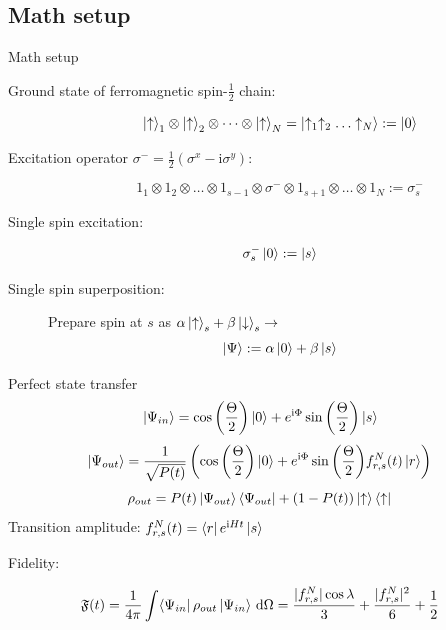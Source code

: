 \documentclass{beamer}
\begin{document}
\subsection{Math setup}
\begin{frame}{Math setup}
	\begin{description}
	\item [Ground state of ferromagnetic spin-$\frac{1}{2}$ chain:] \[ \ket{\uparrow}_1 \otimes \ket{\uparrow}_2 \otimes \dots \otimes \ket{\uparrow}_N = \ket{\uparrow_1\uparrow_2\dots\uparrow_N} := \ket{0} \]
	\item [Excitation operator $\sigma^- = \frac{1}{2}\left(\sigma^x - \text{i}\sigma^y\right)$:] \[ \text{1}_1 \otimes \text{1}_2 \otimes \dots \otimes \text{1}_{s-1} \otimes \sigma^- \otimes \text{1}_{s+1} \otimes \dots \otimes \text{1}_N := \sigma^-_s \]
	\item [Single spin excitation:] \[ \sigma^-_s\ket{0} := \ket{s} \]
	\item [Single spin superposition:] Prepare spin at $s$ as $\alpha\ket{\uparrow}_s + \beta\ket{\downarrow}_s \rightarrow$ \[ \ket{\Psi} := \alpha\ket{0} + \beta\ket{s} \]
	\end{description}
\end{frame}

\begin{frame}{Perfect state transfer}
	\[ \ket{\Psi_{in}} = \cos{\left(\frac{\Theta}{2}\right)} \ket{0} + e^{\text{i}\Phi}\sin{\left(\frac{\Theta}{2}\right)}\ket{s} \]
	\[ \ket{\Psi_{out}} = \frac{1}{\sqrt{P(t)}}\left( \cos{\left(\frac{\Theta}{2}\right)} \ket{0} + e^{\text{i}\Phi}\sin{\left(\frac{\Theta}{2}\right)}f^N_{r,s}(t)\ket{r} \right) \]
	\[ \rho_{out} = P(t)\ket{\Psi_{out}}\bra{\Psi_{out}} + \left( 1-P(t) \right)\ket{\uparrow}\bra{\uparrow} \]
	Transition amplitude: $f^N_{r,s}(t) = \bra{r}e^{\text{i}H t}\ket{s}$\\
	\begin{exampleblock}{Fidelity:}
	\setlength\abovedisplayskip{-8pt}
	\begin{center}
		\[ \mathfrak{F}(t) = \frac{1}{4\pi}\int \!\bra{\Psi_{in}}\rho_{out}\ket{\Psi_{in}} \, \mathrm{d}\Omega = \frac{\lvert f^N_{r,s}\rvert\cos{\lambda}}{3} + \frac{\lvert f^N_{r,s}\rvert^2}{6} + \frac{1}{2}\]
	\end{center}
	\end{exampleblock}
\end{frame}
\end{document}
